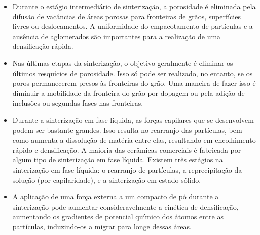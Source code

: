 \begin{itemize}
    \item Durante o estágio intermediário de sinterização, a porosidade é eliminada pela difusão de vacâncias de áreas porosas para fronteiras de grãos, superfícies livres ou deslocamentos. A uniformidade do empacotamento de partículas e a ausência de aglomerados são importantes para a realização de uma densificação rápida.
    \item Nas últimas etapas da sinterização, o objetivo geralmente é eliminar os últimos resquícios de porosidade. Isso só pode ser realizado, no entanto, se os poros permanecerem presos às fronteiras do grão. Uma maneira de fazer isso é diminuir a mobilidade da fronteira do grão por dopagem ou pela adição de inclusões ou segundas fases nas fronteiras.
    \item Durante a sinterização em fase líquida, as forças capilares que se desenvolvem podem ser bastante grandes. Isso resulta no rearranjo das partículas, bem como aumenta a dissolução de matéria entre elas, resultando em encolhimento rápido e densificação. A maioria das cerâmicas comerciais é fabricada por algum tipo de sinterização em fase líquida. Existem três estágios na sinterização em fase líquida: o rearranjo de partículas, a reprecipitação da solução (por capilaridade), e a sinterização em estado sólido.
    \item A aplicação de uma força externa a um compacto de pó durante a sinterização pode aumentar consideravelmente a cinética de densificação, aumentando os gradientes de potencial químico dos átomos entre as partículas, induzindo-os a migrar para longe dessas áreas.
\end{itemize}

